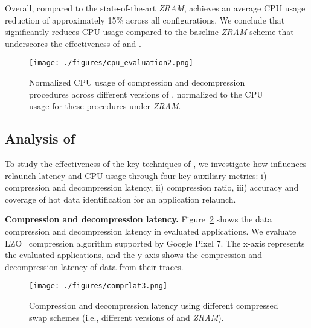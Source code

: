 Overall, compared to the state-of-the-art \emph{ZRAM}, \proposal achieves an average CPU usage reduction of approximately 15\% across all configurations.  We conclude that \proposal significantly reduces CPU usage compared to the baseline \emph{ZRAM} scheme that underscores the effectiveness of \dataorg and \compress.



\begin{figure}[!h]
\vspace{0.3em}
\centering
\texttt{[image: ./figures/cpu\_evaluation2.png]}
\caption{Normalized CPU usage of compression and decompression procedures across different versions of \proposal, normalized to the CPU usage for these procedures under \emph{ZRAM}.}
\label{fig:compression-power-result}
\end{figure}

\subsection{Analysis of \proposal}
\label{sec:breakdown}
To study the effectiveness of the key techniques of \proposal, we investigate how \proposal influences relaunch latency and CPU usage through four key auxiliary metrics: i) compression and decompression latency, ii) compression ratio, iii) accuracy and coverage of hot data identification for an application relaunch.



\noindent\textbf{Compression and decompression latency.}  Figure~\ref{fig:decompression-latency-result} shows the data compression and decompression latency in evaluated applications. We evaluate LZO~\cite{LZO} compression algorithm supported by Google Pixel 7. The x-axis represents the evaluated applications, and the y-axis shows the compression and decompression latency of data from their traces. 
 
\begin{figure}[!h]
\centering
\texttt{[image: ./figures/comprlat3.png]}
\caption{Compression and decompression latency using different compressed swap schemes (i.e., different versions of \proposal and \emph{ZRAM}).}
\label{fig:decompression-latency-result}
\end{figure}

